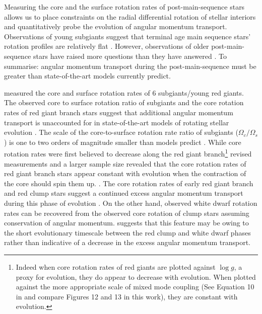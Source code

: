 Measuring the core and the surface rotation rates of post-main-sequence stars allows us to place constraints on the radial differential rotation of stellar interiors and quantitatively probe the evolution of angular momentum transport.
Observations of young subgiants suggest that terminal age main sequence stars' rotation profiles are relatively flat \citep{deheuvels_seismic_2020}.
However, observations of older post-main-sequence stars have raised more questions than they have answered \citep{beck_fast_2012}.
To summarise: angular momentum transport during the post-main-sequence must be greater than state-of-the-art models currently predict.

\citet{deheuvels_seismic_2014} measured the core and surface rotation rates of 6 subgiants/young red giants.
The observed core to surface rotation ratio of subgiants and the core rotation rates of red giant branch stars suggest that additional angular momentum transport is unaccounted for in state-of-the-art models of rotating stellar evolution \citep{deheuvels_seismic_2014, spada_angular_2016, moyano_asteroseismology_2022}.
The scale of the core-to-surface rotation rate ratio of subgiants ($\Omega_c/\Omega_s$) is one to two orders of magnitude smaller than models predict \citep{fuller_asteroseismology_2015,spada_angular_2016,ouazzani_gamma_2018, eggenberger_asteroseismology_2019}.
While core rotation rates were first believed to decrease along the red giant branch\footnote{Indeed when core rotation rates of red giants are plotted against $\log{g}$, a proxy for evolution, they do appear to decrease with evolution. When plotted against the more appropriate scale of mixed mode coupling (See Equation 10 in \citet{gehan_core_2018} and compare Figures 12 and 13 in this work), they are constant with evolution.} \citep{mosser_spin_2012} revised measurements and a larger sample size revealed that the core rotation rates of red giant branch stars appear constant with evolution when the contraction of the core should spin them up.
\citep{mosser_spin_2012,gehan_core_2018,moyano_asteroseismology_2022}.
The core rotation rates of early red giant branch and red clump stars suggest a continued excess angular momentum transport during this phase of evolution \citep{cantiello_angular_2014,moyano_asteroseismology_2022}.
On the other hand, observed white dwarf rotation rates can be recovered from the observed core rotation of clump stars assuming conservation of angular momentum. \citep{cantiello_angular_2014, den_hartogh_constraining_2019}
\citet{cantiello_angular_2014} suggests that this feature may be owing to the short evolutionary timescale between the red clump and white dwarf phases rather than indicative of a decrease in the excess angular momentum transport.


